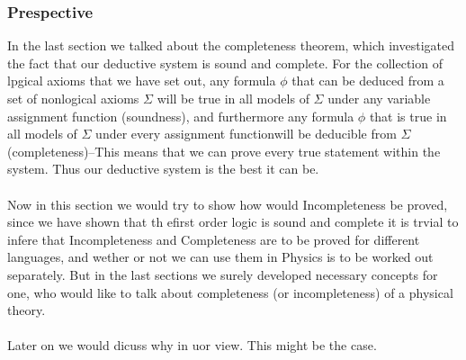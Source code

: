\documentclass[10pt,a4paper]{article}
\newcounter{theo}
\begin{document}
                    \subsubsection{Prespective}
                        In the last section we talked about the completeness theorem, which investigated the fact that our deductive system is sound and complete. For the collection of lpgical axioms that we have set out, any formula $\phi$ that can be deduced from a set of nonlogical axioms $\Sigma$ will be true in all models of $\Sigma$ under any variable assignment function (soundness), and furthermore any formula $\phi$ that is true in all models of $\Sigma$ under every assignment functionwill be deducible from $\Sigma$ (completeness)--This means that we can prove every true statement within the system. Thus our deductive system is the best it can be.\cite{Hajek2007-fq}
                        \\
                        \\
                        Now in this section we would try to show how would Incompleteness be proved, since we have shown that th efirst order logic is sound and complete it is trvial to infere that Incompleteness and Completeness are to be proved for different languages, and wether or not we can use them in Physics is to be worked out separately. But in the last sections we surely developed necessary concepts for one, who would like to talk about completeness (or incompleteness) of a physical theory.
                        \\
                        \\
                        Later on we would dicuss why in uor view. This might be the case.
\end{document}
